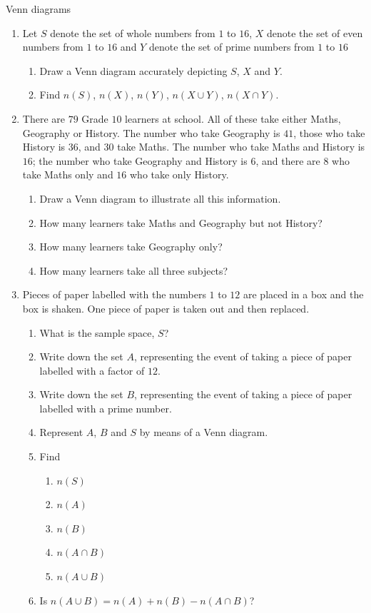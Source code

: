 \begin{exercises}{Venn diagrams}\noindent
  \begin{enumerate}[itemsep=5pt, label=\textbf{\arabic*}. ]
  \item  Let $S$ denote the set of whole numbers from $1$ to $16$, $X$
    denote the set of even numbers from $1$ to $16$ and $Y$ denote the
    set of prime numbers from $1$ to $16$
    \begin{enumerate}
    \item Draw a Venn diagram accurately depicting $S$, $X$ and $Y$.
    \item Find $n\left(S\right)$, $n\left(X\right)$, $n\left(Y\right)$,
      $n\left(X\cup Y\right)$, $n\left(X\cap Y\right)$.
    \end{enumerate}
  \item There are $79$ Grade $10$ learners at school. All of these
    take either Maths, Geography or History. The number who take
    Geography is $41$, those who take History is $36$, and $30$ take
    Maths. The number who take Maths and History is $16$; the number
    who take Geography and History is $6$, and there are $8$ who take
    Maths only and $16$ who take only History.
    \begin{enumerate}
    \item Draw a Venn diagram to illustrate all this information.
    \item How many learners take Maths and Geography but not History?
    \item How many learners take Geography only?
    \item How many learners take all three subjects?
    \end{enumerate}
  \item Pieces of paper labelled with the numbers $1$ to $12$ are
    placed in a box and the box is shaken. One piece of paper is taken
    out and then replaced.
    \begin{enumerate}
    \item What is the sample space, $S$?
    \item Write down the set $A$, representing the event of taking a
      piece of paper labelled with a factor of $12$.
    \item Write down the set $B$, representing the event of taking a
      piece of paper labelled with a prime number.
    \item Represent $A$, $B$ and $S$ by means of a Venn diagram.
    \item Find
      \begin{enumerate}
      \item $n\left(S\right)$
      \item $n\left(A\right)$
      \item $n\left(B\right)$
      \item $n\left(A\cap B\right)$
      \item $n\left(A\cup B\right)$
      \end{enumerate}
    \item Is $n\left(A\cup B\right)=n\left(A\right)+n\left(B\right)-n\left(A\cap B\right)$?
    \end{enumerate}
  \end{enumerate}


\end{exercises}
